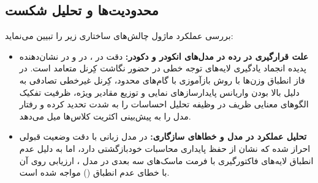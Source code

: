\subsection{محدودیت‌ها و تحلیل شکست}
بررسی عملکرد ماژول  چالش‌های ساختاری زیر را تبیین می‌نماید:
\begin{itemize}
    \item \textbf{علت قرارگیری در رده  در مدل‌های انکودر و دکودر:} دقت  در ،  در  و  در  نشان‌دهنده پدیده انجماد یادگیری لایه‌های توجه خطی در حضور نگاشت کِرنل متعامد است. در فاز انطباق وزن‌ها با روش بازآموزی با گام‌های محدود، کِرنل غیرخطی تصادفی به دلیل بالا بودن واریانس پایدارسازهای نمایی و توزیع مقادیر ویژه، ظرفیت تفکیک الگوهای معنایی ظریف در وظیفه تحلیل احساسات را به شدت تحدید کرده و رفتار مدل را به پیش‌بینی اکثریت کلاس‌ها میل می‌دهد.
    \item \textbf{تحلیل عملکرد در مدل  و خطاهای سازگاری:} در مدل زبانی  با دقت  وضعیت قبولی  احراز شده که نشان از حفظ پایداری محاسبات خودبازگشتی دارد، اما به دلیل عدم انطباق لایه‌های فاکتورگیری با فرمت ماسک‌های سه بعدی در مدل ، ارزیابی روی آن با خطای عدم انطباق () مواجه شده است.
\end{itemize}
